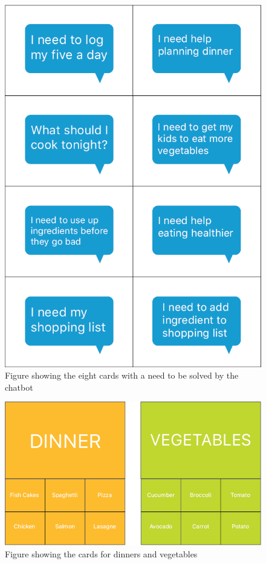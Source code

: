     \begin{figure}[h]
            \centering
            \includegraphics[scale=0.5]{figures/userneeds.png}
            \caption{Figure showing the eight cards with a need to be solved by the chatbot}
            \label{fig:userneed}
        \end{figure}
        
    \begin{figure}[h]
            \centering
            \includegraphics[scale=0.5]{figures/dinnerveg.png}
            \caption{Figure showing the cards for dinners and vegetables}
            \label{fig:userneed}
        \end{figure}
        
